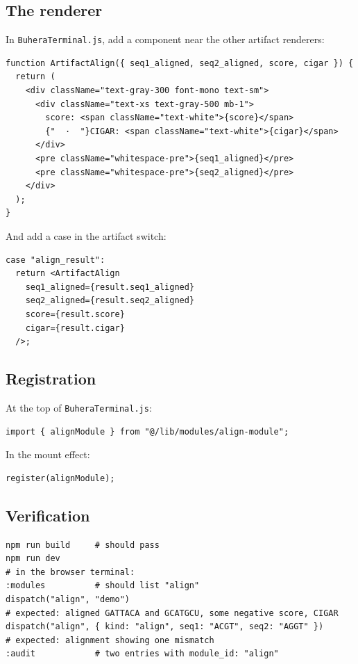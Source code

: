 \documentclass[11pt,a4paper]{article}
\theoremstyle{contract}
\begin{document}
\subsection{The renderer}

In \texttt{BuheraTerminal.js}, add a component near the other artifact
renderers:

\begin{lstlisting}
function ArtifactAlign({ seq1_aligned, seq2_aligned, score, cigar }) {
  return (
    <div className="text-gray-300 font-mono text-sm">
      <div className="text-xs text-gray-500 mb-1">
        score: <span className="text-white">{score}</span>
        {"  ·  "}CIGAR: <span className="text-white">{cigar}</span>
      </div>
      <pre className="whitespace-pre">{seq1_aligned}</pre>
      <pre className="whitespace-pre">{seq2_aligned}</pre>
    </div>
  );
}
\end{lstlisting}

And add a case in the artifact switch:

\begin{lstlisting}
case "align_result":
  return <ArtifactAlign
    seq1_aligned={result.seq1_aligned}
    seq2_aligned={result.seq2_aligned}
    score={result.score}
    cigar={result.cigar}
  />;
\end{lstlisting}

\subsection{Registration}

At the top of \texttt{BuheraTerminal.js}:

\begin{lstlisting}
import { alignModule } from "@/lib/modules/align-module";
\end{lstlisting}

In the mount effect:

\begin{lstlisting}
register(alignModule);
\end{lstlisting}

\subsection{Verification}

\begin{lstlisting}[style=shell]
npm run build     # should pass
npm run dev
# in the browser terminal:
:modules          # should list "align"
dispatch("align", "demo")
# expected: aligned GATTACA and GCATGCU, some negative score, CIGAR
dispatch("align", { kind: "align", seq1: "ACGT", seq2: "AGGT" })
# expected: alignment showing one mismatch
:audit            # two entries with module_id: "align"
\end{lstlisting}
\end{document}
